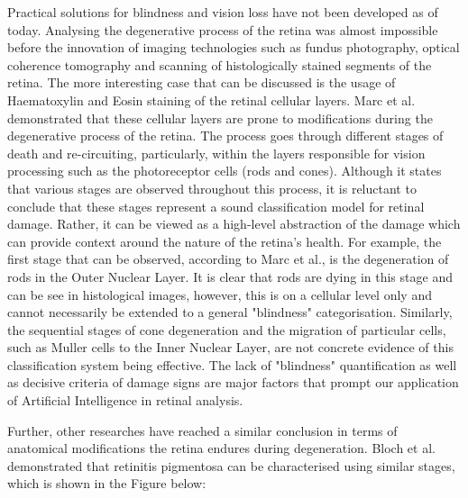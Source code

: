 \documentclass[a4paper]{article}
\begin{document}
        Practical solutions for blindness and vision loss have not been developed as of today. Analysing the degenerative process of the retina was almost impossible before the innovation of imaging technologies such as fundus photography, optical coherence tomography and scanning of histologically stained segments of the retina. The more interesting case that can be discussed is the usage of Haematoxylin and Eosin staining of the retinal cellular layers. Marc et al. \cite{RN8} demonstrated that these cellular layers are prone to modifications during the degenerative process of the retina. The process goes through different stages of death and re-circuiting, particularly, within the layers responsible for vision processing such as the photoreceptor cells (rods and cones). Although it states that various stages are observed throughout this process, it is reluctant to conclude that these stages represent a sound classification model for retinal damage. Rather, it can be viewed as a high-level abstraction of the damage which can provide context around the nature of the retina's health. For example, the first stage that can be observed, according to Marc et al., is the degeneration of rods in the Outer Nuclear Layer. It is clear that rods are dying in this stage and can be see in histological images, however, this is on a cellular level only and cannot necessarily be extended to a general "blindness" categorisation. Similarly, the sequential stages of cone degeneration and the migration of particular cells, such as Muller cells to the Inner Nuclear Layer, are not concrete evidence of this classification system being effective. The lack of "blindness" quantification as well as decisive criteria of damage signs are major factors that prompt our application of Artificial Intelligence in retinal analysis.
        \vspace{3mm}

        Further, other researches have reached a similar conclusion in terms of anatomical modifications the retina endures during degeneration. Bloch et al. \cite{RN10} demonstrated that retinitis pigmentosa can be characterised using similar stages, which is shown in the Figure below:
        \vspace{3mm}
\end{document}
